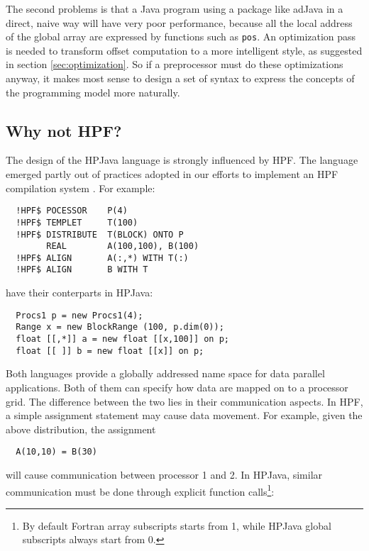 The second problems is that a Java program using a package like adJava
in a direct, naive way will have very poor performance, because all the
local address of the global array are expressed by functions such as
\texttt{pos}.  An optimization pass is needed to transform offset
computation to a more intelligent style, as suggested in section
\ref{sec:optimization}.  So if a preprocessor must do these
optimizations anyway, it makes most sense to design a set of syntax to
express the concepts of the programming model more naturally.

\subsection{Why not HPF?}

The design of the HPJava language is strongly influenced by HPF.
The language emerged partly out of practices adopted in our efforts to
implement an HPF compilation system \cite{PCRC_based}.  For example:
\begin{small}
\begin{verbatim}
  !HPF$ POCESSOR    P(4)
  !HPF$ TEMPLET     T(100)
  !HPF$ DISTRIBUTE  T(BLOCK) ONTO P
        REAL        A(100,100), B(100)
  !HPF$ ALIGN       A(:,*) WITH T(:)
  !HPF$ ALIGN       B WITH T
\end{verbatim}
\end{small}
have their conterparts in HPJava:
\begin{small}
\begin{verbatim}
  Procs1 p = new Procs1(4);
  Range x = new BlockRange (100, p.dim(0));
  float [[,*]] a = new float [[x,100]] on p;
  float [[ ]] b = new float [[x]] on p;
\end{verbatim}
\end{small}
Both languages provide a globally addressed name space for data parallel
applications.  Both of them can specify how data are mapped on to a
processor grid.  The difference between the two lies in their
communication aspects.  In HPF, a simple assignment statement may cause data
movement.  For example, given the above distribution, the assignment
\begin{small}
\begin{verbatim}
  A(10,10) = B(30)
\end{verbatim}
\end{small}
will cause communication between processor 1 and 2.  In HPJava, similar
communication must be done through explicit function calls\footnote{By default
Fortran array subscripts starts from 1, while HPJava global subscripts always
start from 0.}:
